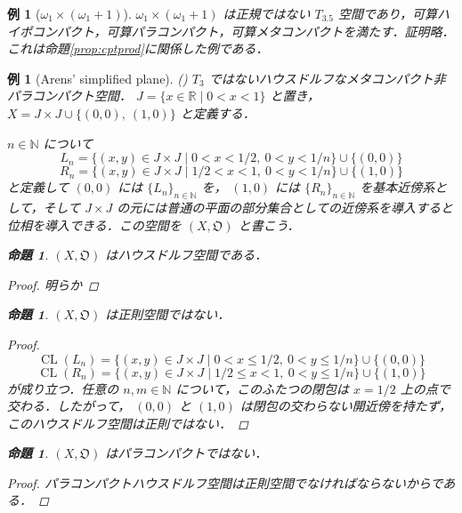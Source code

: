 \documentclass[leqno, 12pt]{ltjsarticle}
\newtheorem{prop}[thm]{命題}
\newtheorem{exam}[thm]{例}
\newcommand{\nn}{\mathbb{N}}
\newcommand{\rr}{\mathbb{R}}
\newcommand{\omegaone}{\omega_{1}}
\DeclareMathOperator{\cl}{CL}
\begin{document}
\begin{exam}[$\omegaone\times (\omegaone+1)$]
$\omegaone\times (\omegaone+1)$
は正規ではない
$T_{3.5}$
空間であり，可算ハイポコンパクト，可算パラコンパクト，可算メタコンパクトを満たす．証明略．これは命題\ref{prop:cptprod}に関係した例である．
\end{exam}


\begin{exam}[Arens' simplified plane](\cite{Counter})
$T_{3}$
ではないハウスドルフなメタコンパクト非パラコンパクト空間．
$J=\{x\in \rr \mid 0<x<1\}$
と置き，
$X=J\times J\cup \{(0,0),\ (1,0)\}$
と定義する．\par
$n\in \nn$
について
\[
L_{n}=\{(x,y)\in J\times J \mid 0<x<1/2,\ 0<y<1/n\}\cup \{(0,0)\}
\]
\[
R_{n}=\{(x,y)\in J\times J \mid 1/2<x<1,\ 0<y<1/n\}\cup \{(1,0)\}
\]
と定義して
$(0,0)$
には
$\{L_{n}\}_{n\in \nn}$
を，
$(1,0)$
には
$\{R_{n}\}_{n\in \nn}$
を基本近傍系として，そして
$J\times J$
の元には普通の平面の部分集合としての近傍系を導入すると位相を導入できる．この空間を
$(X,\mathfrak{O})$
と書こう．

\begin{prop}
$(X,\mathfrak{O})$
はハウスドルフ空間である．
\end{prop}
\begin{proof}
明らか
\end{proof}


\begin{prop}
$(X,\mathfrak{O})$
は正則空間ではない．
\end{prop}
\begin{proof}
\[
\cl(L_{n})=\{(x,y)\in J\times J \mid 0<x\le 1/2,\ 0<y\le 1/n\}\cup \{(0,0)\}
\]
\[
\cl(R_{n})=\{(x,y)\in J\times J \mid 1/2\le x<1,\ 0<y\le 1/n\}\cup \{(1,0)\}
\]
が成り立つ．任意の
$n,m\in\nn$
について，このふたつの閉包は
$x=1/2$
上の点で交わる．したがって，
$(0,0)$
と
$(1,0)$
は閉包の交わらない開近傍を持たず，このハウスドルフ空間は正則ではない．
\end{proof}


\begin{prop}
$(X,\mathfrak{O})$
はパラコンパクトではない．
\end{prop}
\begin{proof}
パラコンパクトハウスドルフ空間は正則空間でなければならないからである．
\end{proof}



\end{exam}
\end{document}

